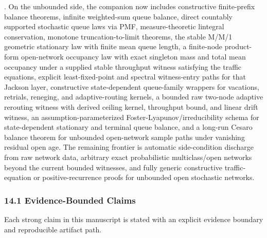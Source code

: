 \documentclass[
]{article}
\begin{document}
. On the unbounded side, the companion now includes constructive
finite-prefix balance theorems, infinite weighted-sum queue balance,
direct countably supported stochastic queue laws via PMF,
measure-theoretic lintegral conservation, monotone truncation-to-limit
theorems, the stable M/M/1 geometric stationary law with finite mean
queue length, a finite-node product-form open-network occupancy law with
exact singleton mass and total mean occupancy under a supplied stable
throughput witness satisfying the traffic equations, explicit
least-fixed-point and spectral witness-entry paths for that Jackson
layer, constructive state-dependent queue-family wrappers for vacations,
retrials, reneging, and adaptive-routing kernels, a bounded raw two-node
adaptive rerouting witness with derived ceiling kernel, throughput
bound, and linear drift witness, an assumption-parameterized
Foster-Lyapunov/irreducibility schema for state-dependent stationary and
terminal queue balance, and a long-run Cesaro balance theorem for
unbounded open-network sample paths under vanishing residual open age.
The remaining frontier is automatic side-condition discharge from raw
network data, arbitrary exact probabilistic multiclass/open networks
beyond the current bounded witnesses, and fully generic constructive
traffic-equation or positive-recurrence proofs for unbounded open
stochastic networks.

\subsubsection{\texorpdfstring{\textbf{14.1 Evidence-Bounded
Claims}}{14.1 Evidence-Bounded Claims}}\label{evidence-bounded-claims}

Each strong claim in this manuscript is stated with an explicit evidence
boundary and reproducible artifact path.
\end{document}
